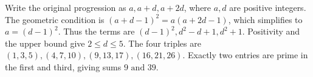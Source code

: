Write the original progression as $ a,a+d,a+2d $, where $ a,d $ are positive integers. The geometric condition is $(a+d-1)^2=a(a+2d-1)$, which simplifies to $ a=(d-1)^2 $. Thus the terms are $(d-1)^2,d^2-d+1,d^2+1 $. Positivity and the upper bound give $ 2\le d\le5 $. The four triples are $(1,3,5),(4,7,10),(9,13,17),(16,21,26)$. Exactly two entries are prime in the first and third, giving sums $\boxed{9\text{ and }39}$.
